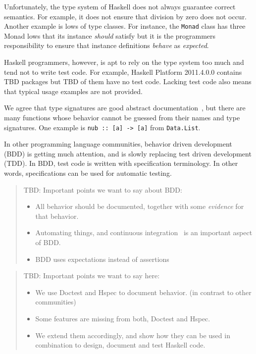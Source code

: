 \documentclass[preprint]{sigplanconf}
\begin{document}
Unfortunately, the type system of Haskell does not always guarantee
correct semantics.
For example, it does not ensure that division by zero does not occur.
Another example is lows of type classes. 
For instance, the {\tt Monad} class has three Monad lows 
that its instance \emph{should} satisfy
but
it is the programmers responsibility to ensure that
instance definitions \emph{behave} as \emph{expected}.

Haskell programmers, however, is apt to rely on the type system too much
and tend not to write test code.
For example, Haskell Platform 2011.4.0.0 contains
TBD packages but TBD of them have no test code.
Lacking test code also means that typical usage examples are not provided.

We agree that type signatures are good abstract documentation~\cite{free}, but
there are many functions whose behavior cannot be guessed from their names and
type signatures.  One example is \verb|nub :: [a] -> [a]| from {\tt Data.List}.

In other programming language communities,
behavior driven development (BDD) is getting much attention, and is
slowly replacing test driven development (TDD).
In BDD, test code is written with specification terminology.
In other words, specifications can be used for automatic testing.

\begin{quote}
    TBD: Important points we want to say about BDD:
    \begin{itemize}
        \item
            All behavior should be documented, together with some
            \emph{evidence} for that behavior.

        \item
            Automating things, and continuous integration~\cite{ci} is an important
            aspect of BDD.
        \item
            BDD uses expectations instead of assertions
    \end{itemize}
\end{quote}

\begin{quote}
    TBD: Important points we want to say here:
    \begin{itemize}
        \item
            We use Doctest and Hspec to document behavior.
            (in contrast to other communities)
        \item
            Some features are missing from both, Doctest and
            Hspec.
        \item
            We extend them accordingly, and show how they can be used
            in combination to design, document and test Haskell code.
    \end{itemize}
\end{quote}
\end{document}
